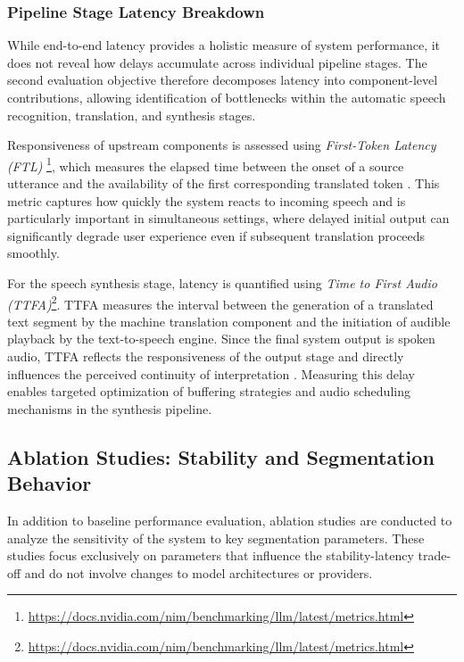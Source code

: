 \subsubsection{Pipeline Stage Latency Breakdown}
\label{sec:eval_stage_latency}

While end-to-end latency provides a holistic measure of system performance, it does not reveal how delays accumulate across individual pipeline stages. The second evaluation objective therefore decomposes latency into component-level contributions, allowing identification of bottlenecks within the automatic speech recognition, translation, and synthesis stages.

Responsiveness of upstream components is assessed using \emph{First-Token Latency (FTL)} \footnote{\url{https://docs.nvidia.com/nim/benchmarking/llm/latest/metrics.html}}, which measures the elapsed time between the onset of a source utterance and the availability of the first corresponding translated token \cite{chen2024core}. This metric captures how quickly the system reacts to incoming speech and is particularly important in simultaneous settings, where delayed initial output can significantly degrade user experience even if subsequent translation proceeds smoothly.

For the speech synthesis stage, latency is quantified using \emph{Time to First Audio (TTFA)}\footnote{\url{https://docs.nvidia.com/nim/benchmarking/llm/latest/metrics.html}}. TTFA measures the interval between the generation of a translated text segment by the machine translation component and the initiation of audible playback by the text-to-speech engine. Since the final system output is spoken audio, TTFA reflects the responsiveness of the output stage and directly influences the perceived continuity of interpretation \cite{chen2024core}. Measuring this delay enables targeted optimization of buffering strategies and audio scheduling mechanisms in the synthesis pipeline.

\subsection{Ablation Studies: Stability and Segmentation Behavior}
\label{sec:eval_stability}

In addition to baseline performance evaluation, ablation studies are conducted to analyze the sensitivity of the system to key segmentation parameters. These studies focus exclusively on parameters that influence the stability-latency trade-off and do not involve changes to model architectures or providers.

